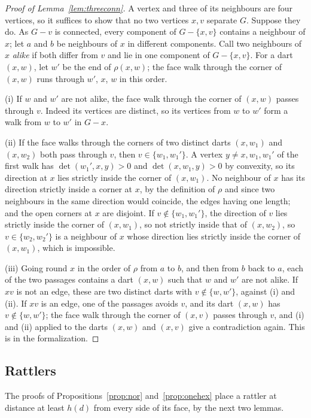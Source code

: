 \documentclass[12pt]{amsart}
\theoremstyle{definition}
\theoremstyle{plain}
\theoremstyle{definition}
\begin{document}
\begin{proof}[Proof of Lemma~\ref{lem:threeconn}]
A vertex and three of its neighbours are four vertices, so it suffices to show that no two vertices $x,v$ separate $G$. Suppose they do. As $G-v$ is connected, every component of $G-\{x,v\}$ contains a neighbour of $x$; let $a$ and $b$ be neighbours of $x$ in different components. Call two neighbours of $x$ \emph{alike} if both differ from $v$ and lie in one component of $G-\{x,v\}$. For a dart $(x,w)$, let $w'$ be the end of $\rho(x,w)$; the face walk through the corner of $(x,w)$ runs through $w'$, $x$, $w$ in this order.

(i) If $w$ and $w'$ are not alike, the face walk through the corner of $(x,w)$ passes through $v$. Indeed its vertices are distinct, so its vertices from $w$ to $w'$ form a walk from $w$ to $w'$ in $G-x$.

(ii) If the face walks through the corners of two distinct darts $(x,w_1)$ and $(x,w_2)$ both pass through $v$, then $v\in\{w_1,w_1'\}$. A vertex $y\ne x,w_1,w_1'$ of the first walk has $\det(w_1',x,y)>0$ and $\det(x,w_1,y)>0$ by convexity, so its direction at $x$ lies strictly inside the corner of $(x,w_1)$. No neighbour of $x$ has its direction strictly inside a corner at $x$, by the definition of $\rho$ and since two neighbours in the same direction would coincide, the edges having one length; and the open corners at $x$ are disjoint. If $v\notin\{w_1,w_1'\}$, the direction of $v$ lies strictly inside the corner of $(x,w_1)$, so not strictly inside that of $(x,w_2)$, so $v\in\{w_2,w_2'\}$ is a neighbour of $x$ whose direction lies strictly inside the corner of $(x,w_1)$, which is impossible.

(iii) Going round $x$ in the order of $\rho$ from $a$ to $b$, and then from $b$ back to $a$, each of the two passages contains a dart $(x,w)$ such that $w$ and $w'$ are not alike. If $xv$ is not an edge, these are two distinct darts with $v\notin\{w,w'\}$, against (i) and (ii). If $xv$ is an edge, one of the passages avoids $v$, and its dart $(x,w)$ has $v\notin\{w,w'\}$; the face walk through the corner of $(x,v)$ passes through $v$, and (i) and (ii) applied to the darts $(x,w)$ and $(x,v)$ give a contradiction again. This is  in the formalization.
\end{proof}

\subsection{Rattlers}
The proofs of Propositions~\ref{prop:nor} and~\ref{prop:onehex} place a rattler at distance at least $h(d)$ from every side of its face, by the next two lemmas.
\end{document}
